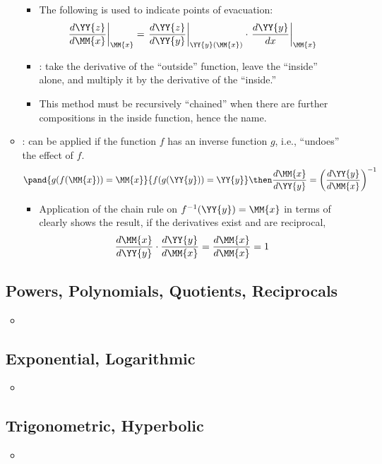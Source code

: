 \begin{itemize}
\begin{itemize}
\begin{itemize}
        \item The following is used to indicate points of evacuation:
        \[
          \left.\frac{d \YY{z}}{d \MM{x}}\right|_\MM{x} = \left. \frac{d
          \YY{z}}{d \YY{y}}\right|_{ \YY{y}\left(\MM{x}  \right) } \cdot
          \left. \frac{d \YY{y}}{dx}\right|_\MM{x}
        \]
        \item {}: take the derivative of the ``outside''
          function, leave the ``inside'' alone, and multiply it by the
          derivative of the ``inside.''
        \item This method must be recursively ``chained'' when there are
          further compositions in the inside function, hence the name.

      \end{itemize}

    \item {}: can be applied if the function \( f \)
      has an inverse function \( g \), i.e., ``undoes'' the effect of \( f \).
      \[
      \pand{g(f(\MM{x})) = \MM{x}}{f(g(\YY{y})) = \YY{y}} \then \frac{d
      \MM{x}}{d \YY{y}} = \left( \frac{d \YY{y}}{d \MM{x}} \right)^{-1}
      \]
      \begin{itemize}
        \item Application of the chain rule on \( f ^{-1}(\YY{y}) = \MM{x} \)
          in terms of  clearly shows the result, if the derivatives
          exist and are reciprocal,
          \[
          \frac{d\MM{x}}{d\YY{y}} \cdot \frac{d\YY{y}}{d\MM{x}} =
          \frac{d\MM{x}}{d\MM{x}} = 1
          \]
      \end{itemize}

  \end{itemize}

  \subsection{Powers, Polynomials, Quotients, Reciprocals}
  \begin{itemize}
    \item
  \end{itemize}

  \subsection{Exponential, Logarithmic}
  \begin{itemize}
    \item
  \end{itemize}

  \subsection{Trigonometric, Hyperbolic}
  \begin{itemize}
    \item
  \end{itemize}
\end{itemize}


